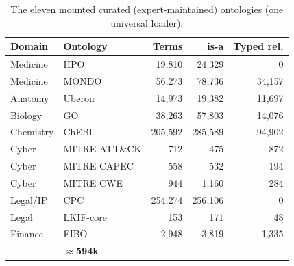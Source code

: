 \documentclass[pdflatex,sn-nature]{sn-jnl}
\begin{document}
\begin{table}[t]\centering\small
\caption{The eleven mounted curated (expert-maintained) ontologies (one universal loader).}
\begin{tabular}{llrrr}
\toprule
Domain & Ontology & Terms & is-a & Typed rel. \\
\midrule
Medicine & HPO & 19{,}810 & 24{,}329 & 0 \\
Medicine & MONDO & 56{,}273 & 78{,}736 & 34{,}157 \\
Anatomy & Uberon & 14{,}973 & 19{,}382 & 11{,}697 \\
Biology & GO & 38{,}263 & 57{,}803 & 14{,}076 \\
Chemistry & ChEBI & 205{,}592 & 285{,}589 & 94{,}902 \\
Cyber & MITRE ATT\&CK & 712 & 475 & 872 \\
Cyber & MITRE CAPEC & 558 & 532 & 194 \\
Cyber & MITRE CWE & 944 & 1{,}160 & 284 \\
Legal/IP & CPC & 254{,}274 & 256{,}106 & 0 \\
Legal & LKIF-core & 153 & 171 & 48 \\
Finance & FIBO & 2{,}948 & 3{,}819 & 1{,}335 \\
\midrule
\rowcolor{smarow}\multicolumn{2}{l}{\textbf{Total}} & \textbf{$\approx$594k} & & \\
\bottomrule
\end{tabular}
\end{table}
\end{document}
